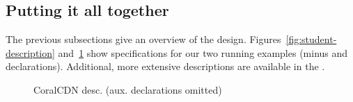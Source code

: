 \subsection{Putting it all together}

The previous subsections give an overview of the \forest{} design.
Figures~\ref{fig:student-description}
and~\ref{fig:coral-description} show \forest{} specifications
for our two running examples (minus \padshaskell{} and \haskell{}
declarations).  Additional, more extensive descriptions are
available in the \auxmaterials.

\begin{figure}

\caption{\forest{} CoralCDN desc. (aux. declarations omitted)}
\label{fig:coral-description}
\end{figure}

